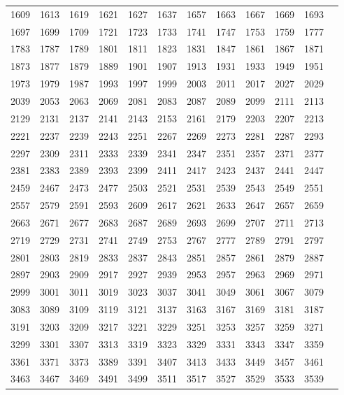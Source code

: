\begin{table}
\begin{tabular}{llllllllllll}
1609 & 1613 & 1619 & 1621 & 1627 & 1637 & 1657 & 1663 & 1667 & 1669 & 1693 \\ 
1697 & 1699 & 1709 & 1721 & 1723 & 1733 & 1741 & 1747 & 1753 & 1759 & 1777 \\ 
1783 & 1787 & 1789 & 1801 & 1811 & 1823 & 1831 & 1847 & 1861 & 1867 & 1871 \\ 
1873 & 1877 & 1879 & 1889 & 1901 & 1907 & 1913 & 1931 & 1933 & 1949 & 1951 \\ 
1973 & 1979 & 1987 & 1993 & 1997 & 1999 & 2003 & 2011 & 2017 & 2027 & 2029 \\ 
2039 & 2053 & 2063 & 2069 & 2081 & 2083 & 2087 & 2089 & 2099 & 2111 & 2113 \\ 
2129 & 2131 & 2137 & 2141 & 2143 & 2153 & 2161 & 2179 & 2203 & 2207 & 2213 \\ 
2221 & 2237 & 2239 & 2243 & 2251 & 2267 & 2269 & 2273 & 2281 & 2287 & 2293 \\ 
2297 & 2309 & 2311 & 2333 & 2339 & 2341 & 2347 & 2351 & 2357 & 2371 & 2377 \\ 
2381 & 2383 & 2389 & 2393 & 2399 & 2411 & 2417 & 2423 & 2437 & 2441 & 2447 \\ 
2459 & 2467 & 2473 & 2477 & 2503 & 2521 & 2531 & 2539 & 2543 & 2549 & 2551 \\ 
2557 & 2579 & 2591 & 2593 & 2609 & 2617 & 2621 & 2633 & 2647 & 2657 & 2659 \\ 
2663 & 2671 & 2677 & 2683 & 2687 & 2689 & 2693 & 2699 & 2707 & 2711 & 2713 \\ 
2719 & 2729 & 2731 & 2741 & 2749 & 2753 & 2767 & 2777 & 2789 & 2791 & 2797 \\ 
2801 & 2803 & 2819 & 2833 & 2837 & 2843 & 2851 & 2857 & 2861 & 2879 & 2887 \\ 
2897 & 2903 & 2909 & 2917 & 2927 & 2939 & 2953 & 2957 & 2963 & 2969 & 2971 \\ 
2999 & 3001 & 3011 & 3019 & 3023 & 3037 & 3041 & 3049 & 3061 & 3067 & 3079 \\ 
3083 & 3089 & 3109 & 3119 & 3121 & 3137 & 3163 & 3167 & 3169 & 3181 & 3187 \\ 
3191 & 3203 & 3209 & 3217 & 3221 & 3229 & 3251 & 3253 & 3257 & 3259 & 3271 \\ 
3299 & 3301 & 3307 & 3313 & 3319 & 3323 & 3329 & 3331 & 3343 & 3347 & 3359 \\ 
3361 & 3371 & 3373 & 3389 & 3391 & 3407 & 3413 & 3433 & 3449 & 3457 & 3461 \\ 
3463 & 3467 & 3469 & 3491 & 3499 & 3511 & 3517 & 3527 & 3529 & 3533 & 3539 \\ 

\end{tabular}
\end{table}
